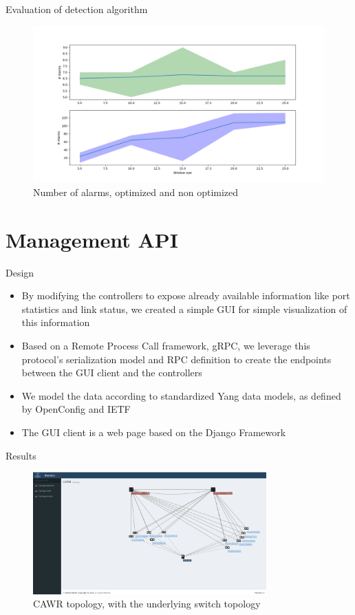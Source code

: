 \documentclass{beamer}
\begin{document}
\begin{frame}{Evaluation of detection algorithm}
    \begin{figure}
        \includegraphics[width=.9\textwidth]{meter_eleph/evaluation_error}
        \caption{Number of alarms, optimized and non optimized}
    \end{figure}
\end{frame}

\section{Management API}

\begin{frame}{Design}
    \begin{itemize}
        \item By modifying the controllers to expose already available information like port statistics
            and link status, we created a simple GUI for simple visualization of this information
            \pause
        \item Based on a Remote Process Call framework, gRPC, we leverage this protocol's serialization model
            and RPC definition to create the endpoints between the GUI client and the controllers
            \pause
        \item We model the data according to standardized Yang data models, as defined by OpenConfig and IETF
            \pause
        \item The GUI client is a web page based on the Django Framework
    \end{itemize}
\end{frame}

\begin{frame}{Results}
    \begin{figure}[!tbph]
      \centering
      \includegraphics[width=0.8\textwidth]{bisdn/cawr_gui}
      \caption {CAWR topology, with the underlying switch topology}
    \end{figure}
\end{frame}
\end{document}
